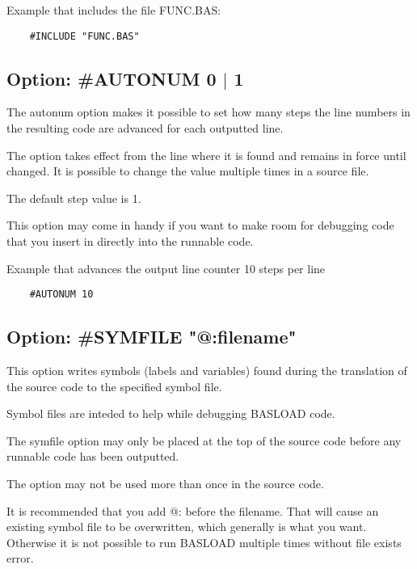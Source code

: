 \documentclass{article}
\begin{document}
        Example that includes the file FUNC.BAS:
        \begin{verbatim}
    #INCLUDE "FUNC.BAS"
        \end{verbatim}    

    \subsection{Option: \#AUTONUM 0 $|$ 1}

        The autonum option makes it possible to set how many
        steps the line numbers in the resulting code are
        advanced for each outputted line.

        The option takes effect from the line where it is
        found and remains in force until changed. It is
        possible to change the value multiple times in a
        source file.

        The default step value is 1.

        This option may come in handy if you want to make
        room for debugging code that you insert in directly
        into the runnable code.
        
        Example that advances the output line counter 10 steps per line
        \begin{verbatim}
    #AUTONUM 10
        \end{verbatim}

    \subsection{Option: \#SYMFILE "@:filename"}

        This option writes symbols (labels and variables) found during the
        translation of the source code to the specified
        symbol file.

        Symbol files are inteded to help while debugging BASLOAD code.
    
        The symfile option may only be placed at the top of
        the source code before any runnable code has
        been outputted.

        The option may not be used more than once in the source code.

        It is recommended that you add @: before the filename. That will cause
        an existing symbol file to be overwritten, which generally is what you
        want. Otherwise it is not possible to run BASLOAD multiple times
        without file exists error.
\end{document}

